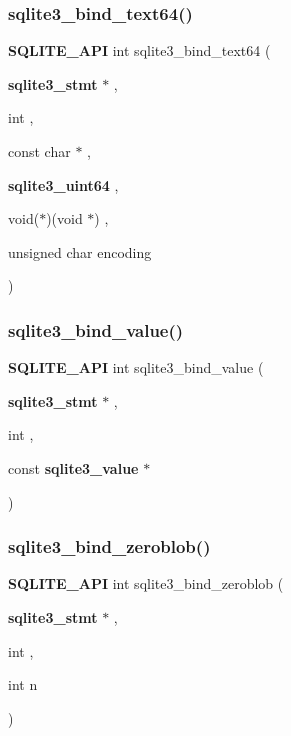 \mbox{\label{sqlite3_8h_a9e493afa3924315ba147f62c4800f415}} 
\subsubsection{sqlite3\_bind\_text64()}
{\footnotesize\ttfamily \textbf{ S\+Q\+L\+I\+T\+E\+\_\+\+A\+PI} int sqlite3\+\_\+bind\+\_\+text64 (\begin{DoxyParamCaption}\item[{\textbf{ sqlite3\+\_\+stmt} $\ast$}]{,  }\item[{int}]{,  }\item[{const char $\ast$}]{,  }\item[{\textbf{ sqlite3\+\_\+uint64}}]{,  }\item[{void($\ast$)(void $\ast$)}]{,  }\item[{unsigned char}]{encoding }\end{DoxyParamCaption})}

\mbox{\label{sqlite3_8h_a962df8800a9e412161fee0add5f7267e}} 
\subsubsection{sqlite3\_bind\_value()}
{\footnotesize\ttfamily \textbf{ S\+Q\+L\+I\+T\+E\+\_\+\+A\+PI} int sqlite3\+\_\+bind\+\_\+value (\begin{DoxyParamCaption}\item[{\textbf{ sqlite3\+\_\+stmt} $\ast$}]{,  }\item[{int}]{,  }\item[{const \textbf{ sqlite3\+\_\+value} $\ast$}]{ }\end{DoxyParamCaption})}

\mbox{\label{sqlite3_8h_afd35a95aa65e816b43cc2dc03abd118b}} 
\subsubsection{sqlite3\_bind\_zeroblob()}
{\footnotesize\ttfamily \textbf{ S\+Q\+L\+I\+T\+E\+\_\+\+A\+PI} int sqlite3\+\_\+bind\+\_\+zeroblob (\begin{DoxyParamCaption}\item[{\textbf{ sqlite3\+\_\+stmt} $\ast$}]{,  }\item[{int}]{,  }\item[{int}]{n }\end{DoxyParamCaption})}

